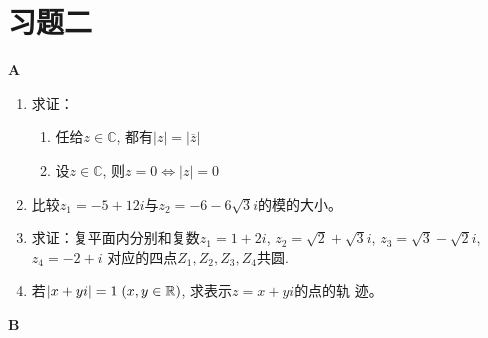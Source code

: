 \section*{习题二}
\begin{center}
\bfseries A
\end{center}

\begin{enumerate}
    \item 求证： \begin{enumerate}[(1)]
        \item 任给$z\in \mathbb{C}$, 都有$|z|=|\overline z|$
        \item 设$z\in \mathbb{C}$, 则$z=0\Longleftrightarrow|z|=0$
    \end{enumerate}
\item 比较$z_{1}=-5+12i$与$z_{2}=-6-6\sqrt{3}i$的模的大小。
\item 求证：复平面内分别和复数$z_1=1+2i$, $z_{2}=\sqrt{2}+\sqrt{3}i$, $z_{3}=\sqrt{3}-\sqrt{2}i$, $z_{4}=-2+i$
    对应的四点$Z_1,Z_2,Z_3,Z_4$共圆.
\item 若$|x+yi|=1\; (x,y\in \mathbb{R})$, 求表示$z=x+yi$的点的轨
    迹。
\end{enumerate}


\begin{center}
    \bfseries B
    \end{center}

